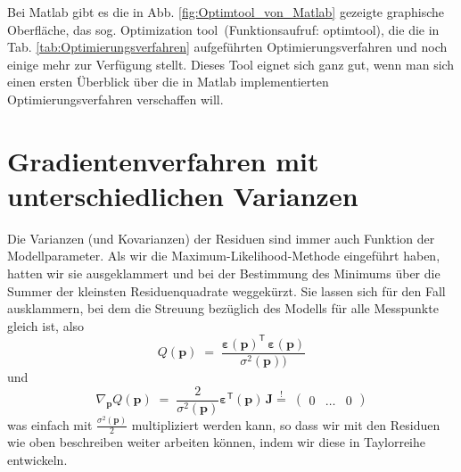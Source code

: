 Bei Matlab gibt es die in Abb. \ref{fig:Optimtool_von_Matlab} gezeigte graphische Oberfläche, das sog.
\glq Optimization tool\grq~(Funktionsaufruf: \glq optimtool\grq),
die die in Tab. \ref*{tab:Optimierungsverfahren} aufgeführten
Optimierungsverfahren und noch einige mehr zur Verfügung stellt.
Dieses Tool eignet sich ganz gut, wenn man sich einen ersten Überblick
über die in Matlab implementierten Optimierungsverfahren verschaffen will. \\

\newpage
\section{Gradientenverfahren mit unterschiedlichen Varianzen}
\label{unterschiedVar}
Die Varianzen (und Kovarianzen) der Residuen sind immer auch Funktion der Modellparameter. Als wir die
Maximum-Likelihood-Methode eingeführt haben, hatten wir sie ausgeklammert und bei der Bestimmung
des Minimums über die Summer der kleinsten Residuenquadrate weggekürzt. Sie
lassen sich für den Fall ausklammern, bei dem die Streuung bezüglich des Modells
für alle Messpunkte gleich ist, also
\begin{equation}
Q(\mathbf{p}) \; = \;
 \frac{\boldsymbol{\varepsilon}(\mathbf{p})^\mathsf{T} \, \boldsymbol{\varepsilon}(\mathbf{p})}{\sigma^2(\mathbf{p}))}
\end{equation}
und
\begin{equation}
\nabla_{\mathbf{p}} Q(\mathbf{p})  \; = \; 
\frac{2}{\sigma^2(\mathbf{p})} \boldsymbol{\varepsilon}^\textsf{T}(\mathbf{p})
 \, \boldsymbol{J} \overset{!}{=} \; \left(\begin{array}{ccc} 0 & \dots & 0 \end{array}\right)
\label{ZielfunktionalGradJmitSigma}
\end{equation}
was einfach mit $\frac{\sigma^2(\mathbf{p})}{2}$ multipliziert werden kann, so dass wir mit
den Residuen wie oben beschreiben weiter arbeiten können, indem wir diese in Taylorreihe entwickeln.


